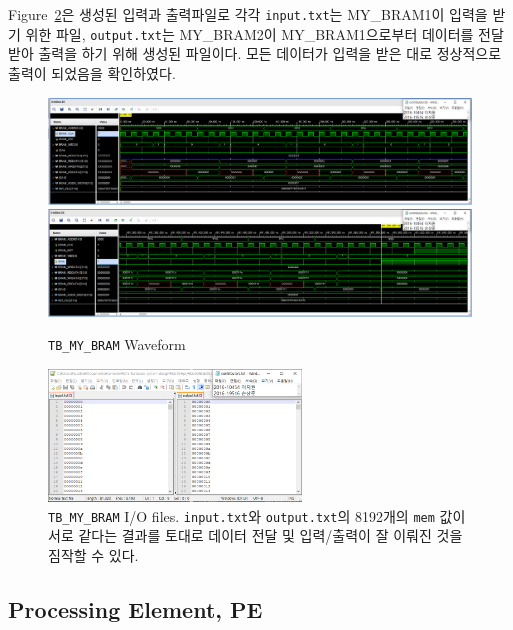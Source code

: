 \documentclass{article}
\begin{document}
Figure~\ref{fig3}은 생성된 입력과 출력파일로 각각 \texttt{input.txt}는 MY\_BRAM1이 입력을 받기 위한 파일, \texttt{output.txt}는 MY\_BRAM2이 MY\_BRAM1으로부터 데이터를 전달받아 출력을 하기 위해 생성된 파일이다. 모든 데이터가 입력을 받은 대로 정상적으로 출력이 되었음을 확인하였다.
\begin{figure}[ht]
	\centering
	\includegraphics[width=1.0\textwidth]{../../submission/MY_BRAM/MY_BRAM_Waveform1.png}
	\includegraphics[width=1.0\textwidth]{../../submission/MY_BRAM/MY_BRAM_Waveform2.png}
\caption{\texttt{TB\_MY\_BRAM} Waveform}
\label{fig2}
\end{figure}
\begin{figure}[ht]
	\centering
	\includegraphics[width=0.6\textwidth]{../../submission/MY_BRAM/MY_BRAM_result.png}
\caption{\texttt{TB\_MY\_BRAM} I/O files. \texttt{input.txt}와 \texttt{output.txt}의 8192개의 \texttt{mem} 값이 서로 같다는 결과를 토대로 데이터 전달 및 입력/출력이 잘 이뤄진 것을 짐작할 수 있다.}
\label{fig3}
\end{figure}

\newpage
\subsection{Processing Element, PE}
\end{document}
